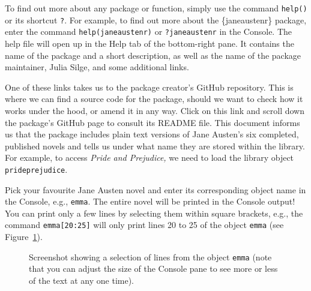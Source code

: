 \documentclass[
  letterpaper,
  DIV=11,
  numbers=noendperiod]{scrreprt}
\begin{document}
To find out more about any package or function, simply use the command
\texttt{help()} or its shortcut \texttt{?}. For example, to find out
more about the \{janeaustenr\} package, enter the command
\texttt{help(janeaustenr)} or \texttt{?janeaustenr} in the Console. The
help file will open up in the Help tab of the bottom-right pane. It
contains the name of the package and a short description, as well as the
name of the package maintainer, Julia Silge, and some additional links.

One of these links takes us to the package creator's GitHub repository.
This is where we can find a source code for the package, should we want
to check how it works under the hood, or amend it in any way. Click on
this link and scroll down the package's GitHub page to consult its
README file. This document informs us that the package includes plain
text versions of Jane Austen's six completed, published novels and tells
us under what name they are stored within the library. For example, to
access \emph{Pride and Prejudice,} we need to load the library object
\texttt{prideprejudice}.

Pick your favourite Jane Austen novel and enter its corresponding object
name in the Console, e.g., \texttt{emma}. The entire novel will be
printed in the Console output! You can print only a few lines by
selecting them within square brackets, e.g., the command
\texttt{emma{[}20:25{]}} will only print lines 20 to 25 of the object
\texttt{emma} (see Figure~\ref{fig-emma2025}).

\begin{figure}


\caption{\label{fig-emma2025}Screenshot showing a selection of lines
from the object \texttt{emma} (note that you can adjust the size of the
Console pane to see more or less of the text at any one time).}

\end{figure}%
\end{document}
